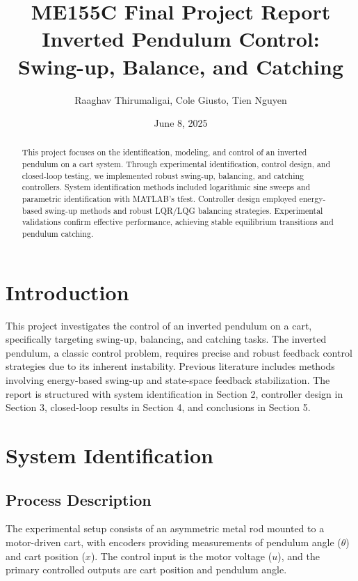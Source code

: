 \documentclass[12pt]{article}
\title{ME155C Final Project Report\\Inverted Pendulum Control: Swing-up, Balance, and Catching}
\author{Raaghav Thirumaligai, Cole Giusto, Tien Nguyen}
\date{June 8, 2025}
\begin{document}
\maketitle

\begin{abstract}
This project focuses on the identification, modeling, and control of an inverted pendulum on a cart system. Through experimental identification, control design, and closed-loop testing, we implemented robust swing-up, balancing, and catching controllers. System identification methods included logarithmic sine sweeps and parametric identification with MATLAB's tfest. Controller design employed energy-based swing-up methods and robust LQR/LQG balancing strategies. Experimental validations confirm effective performance, achieving stable equilibrium transitions and pendulum catching.
\end{abstract}
\clearpage
\section{Introduction}
This project investigates the control of an inverted pendulum on a cart, specifically targeting swing-up, balancing, and catching tasks. The inverted pendulum, a classic control problem, requires precise and robust feedback control strategies due to its inherent instability. Previous literature includes methods involving energy-based swing-up and state-space feedback stabilization. The report is structured with system identification in Section 2, controller design in Section 3, closed-loop results in Section 4, and conclusions in Section 5.

\section{System Identification}

\subsection{Process Description}
The experimental setup consists of an asymmetric metal rod mounted to a motor-driven cart, with encoders providing measurements of pendulum angle ($\theta$) and cart position ($x$). The control input is the motor voltage ($u$), and the primary controlled outputs are cart position and pendulum angle.
\end{document}
